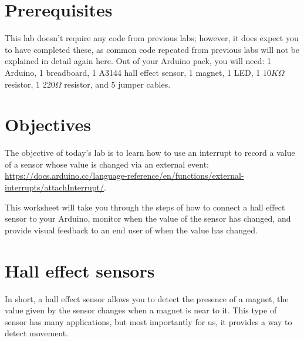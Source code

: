 \documentclass[11pt,a4paper]{article}
\begin{document}
\pagestyle{fancy}

\section*{Prerequisites}
This lab doesn't require any code from previous labs; however, it does expect you to have completed these, as common code repeated from previous labs will not be explained in detail again here. Out of your Arduino pack, you will need: 1 Arduino, 1 breadboard, 1 A3144 hall effect sensor, 1 magnet, 1 LED, 1 $10K\Omega$ resistor, 1 $220\Omega$ resistor, and 5 jumper cables.

\section*{Objectives}
The objective of today's lab is to learn how to use an interrupt to record a value of a sensor whose value is changed via an external event: \url{https://docs.arduino.cc/language-reference/en/functions/external-interrupts/attachInterrupt/}.

This worksheet will take you through the steps of how to connect a hall effect sensor to your Arduino, monitor when the value of the sensor has changed, and provide visual feedback to an end user of when the value has changed.

\section*{Hall effect sensors}
In short, a hall effect sensor allows you to detect the presence of a magnet, the value given by the sensor changes when a magnet is near to it. This type of sensor has many applications, but most importantly for us, it provides a way to detect movement.
\end{document}
